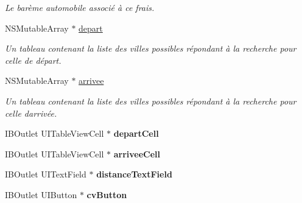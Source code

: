 \begin{DoxyCompactItemize}
\begin{DoxyCompactList}\small\item\em Le barème automobile associé à ce frais. \end{DoxyCompactList}\item 
\hypertarget{interface_indemnites_table_view_controller_ab55017774d4178794b419e79c418cf7c}{}N\+S\+Mutable\+Array $\ast$ \hyperlink{interface_indemnites_table_view_controller_ab55017774d4178794b419e79c418cf7c}{depart}\label{interface_indemnites_table_view_controller_ab55017774d4178794b419e79c418cf7c}

\begin{DoxyCompactList}\small\item\em Un tableau contenant la liste des villes possibles répondant à la recherche pour celle de départ. \end{DoxyCompactList}\item 
\hypertarget{interface_indemnites_table_view_controller_a0733c994aacd00be9dde210fea70e142}{}N\+S\+Mutable\+Array $\ast$ \hyperlink{interface_indemnites_table_view_controller_a0733c994aacd00be9dde210fea70e142}{arrivee}\label{interface_indemnites_table_view_controller_a0733c994aacd00be9dde210fea70e142}

\begin{DoxyCompactList}\small\item\em Un tableau contenant la liste des villes possibles répondant à la recherche pour celle d\textquotesingle{}arrivée. \end{DoxyCompactList}\item 
\hypertarget{interface_indemnites_table_view_controller_a865e847e5f48aadb5ecaec6285365555}{}I\+B\+Outlet U\+I\+Table\+View\+Cell $\ast$ {\bfseries depart\+Cell}\label{interface_indemnites_table_view_controller_a865e847e5f48aadb5ecaec6285365555}

\item 
\hypertarget{interface_indemnites_table_view_controller_ae3b1588cb19734982157fc64dd45f2c8}{}I\+B\+Outlet U\+I\+Table\+View\+Cell $\ast$ {\bfseries arrivee\+Cell}\label{interface_indemnites_table_view_controller_ae3b1588cb19734982157fc64dd45f2c8}

\item 
\hypertarget{interface_indemnites_table_view_controller_a96aea48974d4d211440bf634a0f7a554}{}I\+B\+Outlet U\+I\+Text\+Field $\ast$ {\bfseries distance\+Text\+Field}\label{interface_indemnites_table_view_controller_a96aea48974d4d211440bf634a0f7a554}

\item 
\hypertarget{interface_indemnites_table_view_controller_abf8a2c9eadaace04844fa90a3718c2b2}{}I\+B\+Outlet U\+I\+Button $\ast$ {\bfseries cv\+Button}\label{interface_indemnites_table_view_controller_abf8a2c9eadaace04844fa90a3718c2b2}


\end{DoxyCompactItemize}
